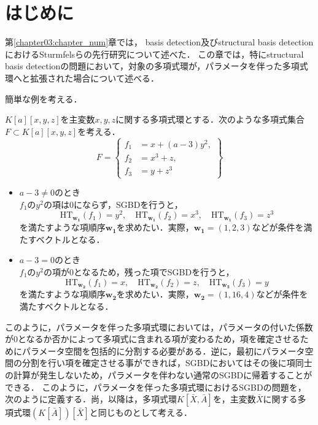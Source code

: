 \section{はじめに}
第\ref{chapter03:chapter_num}章では，\groebner{} basis detection及びstructural \groebner{} basis detectionにおけるSturmfelsらの先行研究について述べた．
この章では，特にstructural \groebner{} basis detectionの問題において，対象の多項式環が，パラメータを伴った多項式環へと拡張された場合について述べる．
\par
簡単な例を考える．
\begin{example}
	\label{chapter04:example:PD_example}
	$K[a][x, y, z]$を主変数$x, y, z$に関する多項式環とする．次のような多項式集合$F\subset K[a][x, y, z]$を考える．
	\begin{equation*}
		F = \left\{
			\begin{aligned}
				f_1 &= x + (a-3)y^2, \\
				f_2 &= x^3 + z, \\
				f_3 &= y + z^3
			\end{aligned}
		\right\}
	\end{equation*}
	\begin{itemize}
		\item $a - 3 \ne 0$のとき\\
			$f_1$の$y^2$の項は$0$にならず，SGBDを行うと，$$\mathrm{HT}_{\bm{w_1}}(f_1) = y^2, \quad \mathrm{HT}_{\bm{w_1}}(f_2) = x^3,\quad \mathrm{HT}_{\bm{w_1}}(f_3) = z^3$$を満たすような項順序$\bm{w_1}$を求めたい．実際，$\bm{w_1}=(1, 2, 3)$などが条件を満たすベクトルとなる．
		\item $a - 3 = 0$のとき\\
			$f_1$の$y^2$の項が$0$となるため，残った項でSGBDを行うと，$$\mathrm{HT}_{\bm{w_2}}(f_1) = x,\quad \mathrm{HT}_{\bm{w_2}}(f_2) = z,\quad \mathrm{HT}_{\bm{w_3}}(f_3) = y$$を満たすような項順序$\bm{w_2}$を求めたい．実際，$\bm{w_2} = (1, 16, 4)$などが条件を満たすベクトルとなる．
	\end{itemize}
\end{example}
このように，パラメータを伴った多項式環においては，パラメータの付いた係数が$0$となるか否かによって多項式に含まれる項が変わるため，項を確定させるためにパラメータ空間を包括的に分割する必要がある．逆に，最初にパラメータ空間の分割を行い項を確定させる事ができれば，SGBDにおいてはその後に項同士の計算が発生しないため，パラメータを伴わない通常のSGBDに帰着することができる．
このように，パラメータを伴った多項式環におけるSGBDの問題を，次のように定義する．尚，以降は，多項式環$K[\bar{X}, \bar{A}]$を，主変数$\bar{X}$に関する多項式環$(K[\bar{A}])[\bar{X}]$と同じものとして考える．
